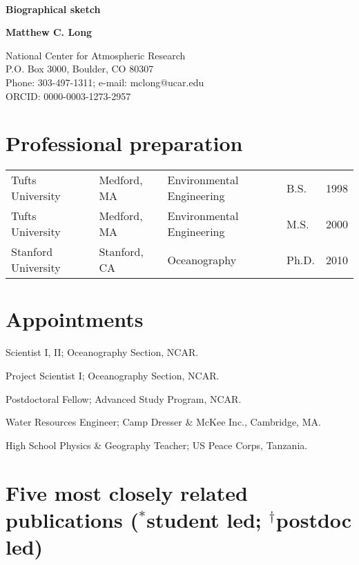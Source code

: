 \documentclass[12pt]{article}
\begin{document}
\thispagestyle{empty}

\begin{center}

\
\vspace{-2em}

\noindent
\textbf{Biographical sketch}

\textbf{Matthew C. Long}

\noindent
National Center for Atmospheric Research\\
P.O. Box 3000, Boulder, CO 80307\\
Phone: 303-497-1311; e-mail: mclong@ucar.edu\\
ORCID: 0000-0003-1273-2957
\end{center}

\vspace{-0.5em}
\section{Professional preparation}

\begin{tabular}{lllll}
Tufts University	&	Medford, MA 	& Environmental Engineering	& B.S.	& 1998 	\\
Tufts University	&  	Medford, MA		& Environmental Engineering	& M.S.	& 2000	\\
Stanford University	&	Stanford, CA	& Oceanography				& Ph.D.	& 2010
\end{tabular}


\section{Appointments}

\begin{description}[style=multiline,leftmargin=2.8cm,font=\normalfont]
\setlength{\itemsep}{-0.3em}
\item[2014--present] {Scientist I, II}; Oceanography Section, NCAR.
\item[2012--2014] {Project Scientist I}; Oceanography Section, NCAR.
\item[2010--2012] {Postdoctoral Fellow}; {Advanced Study Program}, NCAR.
\item[2003--2004] {Water Resources Engineer}; {Camp Dresser \& McKee Inc.}, Cambridge, MA.
\item[2000--2002] {High School Physics \& Geography Teacher}; US Peace Corps, Tanzania.
\end{description}


\section{Five most closely related publications
{\footnotesize ($^*$student led; $^\dagger$postdoc led)}}
\end{document}
